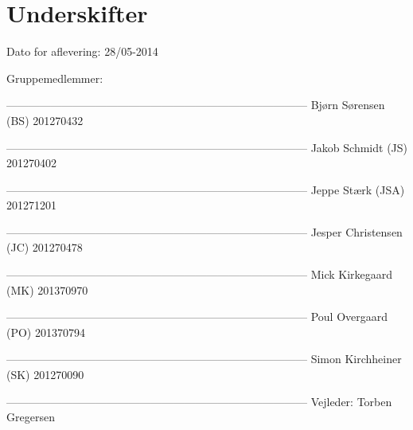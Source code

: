 \chapter*{Underskifter}

Dato for aflevering: 28/05-2014

Gruppemedlemmer:\newline


--------------------------------------------------------------------------------- \newline
Bjørn Sørensen (BS) 201270432\newline


---------------------------------------------------------------------------------\newline
Jakob Schmidt (JS) 201270402\newline


---------------------------------------------------------------------------------\newline
Jeppe Stærk (JSA) 201271201\newline


---------------------------------------------------------------------------------\newline
Jesper Christensen (JC) 201270478\newline


---------------------------------------------------------------------------------\newline
Mick Kirkegaard (MK) 201370970\newline


---------------------------------------------------------------------------------\newline
Poul Overgaard (PO) 201370794\newline


---------------------------------------------------------------------------------\newline
Simon Kirchheiner (SK) 201270090\newline









---------------------------------------------------------------------------------\newline
Vejleder: Torben Gregersen\newline
